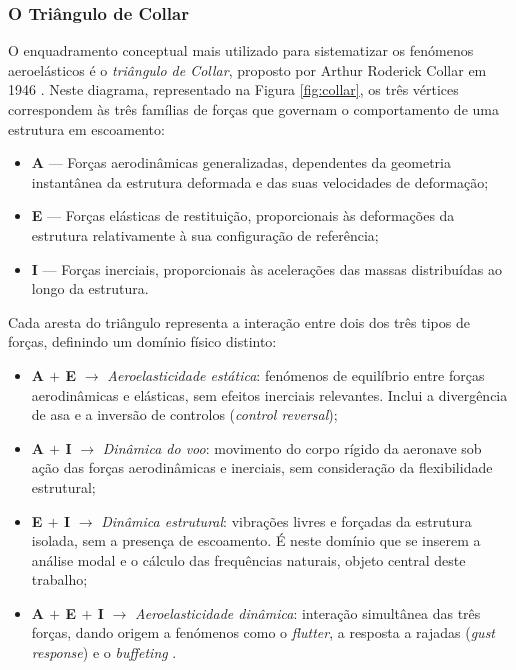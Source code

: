 \documentclass[a4paper,fleqn,noprintline]{cas-dc}
\begin{document}
\subsubsection{O Triângulo de Collar}

O enquadramento conceptual mais utilizado para sistematizar os fenómenos aeroelásticos é o \textit{triângulo de Collar}, proposto por Arthur Roderick Collar em 1946 \cite{Collar1946}. Neste diagrama, representado na Figura \ref{fig:collar}, os três vértices correspondem às três famílias de forças que governam o comportamento de uma estrutura em escoamento:

\begin{itemize}
    \item \textbf{A} --- Forças aerodinâmicas generalizadas, dependentes da geometria instantânea da estrutura deformada e das suas velocidades de deformação;
    \item \textbf{E} --- Forças elásticas de restituição, proporcionais às deformações da estrutura relativamente à sua configuração de referência;
    \item \textbf{I} --- Forças inerciais, proporcionais às acelerações das massas distribuídas ao longo da estrutura.
\end{itemize}

Cada aresta do triângulo representa a interação entre dois dos três tipos de forças, definindo um domínio físico distinto:

\begin{itemize}
    \item \textbf{A $+$ E} $\rightarrow$ \textit{Aeroelasticidade estática}: fenómenos de equilíbrio entre forças aerodinâmicas e elásticas, sem efeitos inerciais relevantes. Inclui a divergência de asa e a inversão de controlos (\textit{control reversal});

    \item \textbf{A $+$ I} $\rightarrow$ \textit{Dinâmica do voo}: movimento do corpo rígido da aeronave sob ação das forças aerodinâmicas e inerciais, sem consideração da flexibilidade estrutural;

    \item \textbf{E $+$ I} $\rightarrow$ \textit{Dinâmica estrutural}: vibrações livres e forçadas da estrutura isolada, sem a presença de escoamento. É neste domínio que se inserem a análise modal e o cálculo das frequências naturais, objeto central deste trabalho;

    \item \textbf{A $+$ E $+$ I} $\rightarrow$ \textit{Aeroelasticidade dinâmica}: interação simultânea das três forças, dando origem a fenómenos como o \textit{flutter}, a resposta a rajadas (\textit{gust response}) e o \textit{buffeting} \cite{Dowell2004, Wright2015}.
\end{itemize}
\end{document}
